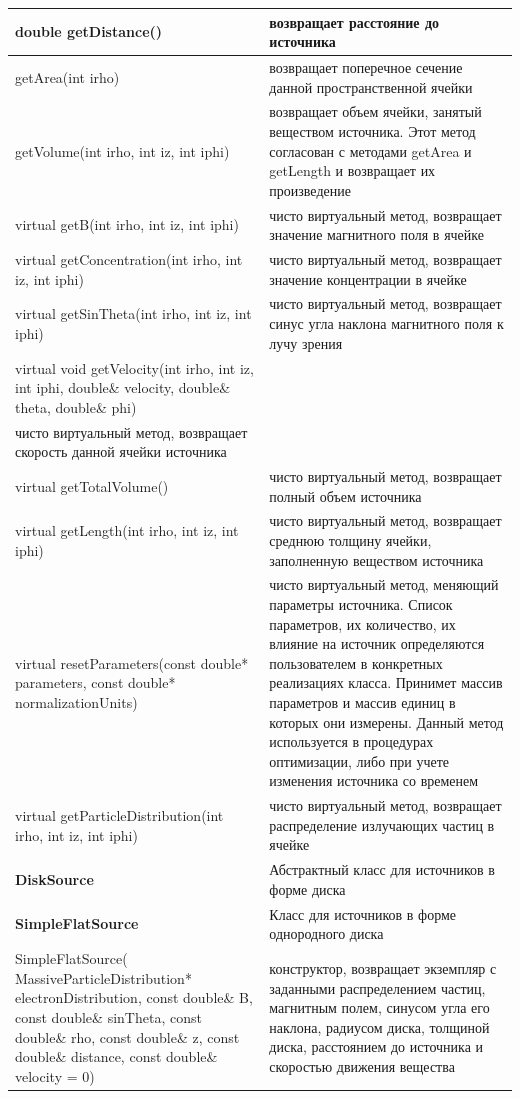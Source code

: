 \begin{small}
\begin{xtabular}{|p{0.5\textwidth}|p{0.5\textwidth}|}
		\hline
		double getDistance() & возвращает расстояние до источника\\
		\hline
		getArea(int irho) & возвращает поперечное сечение данной пространственной ячейки\\
		\hline
		getVolume(int irho, int iz, int iphi) & возвращает объем ячейки, занятый веществом источника. Этот метод согласован с методами getArea и getLength и возвращает их произведение\\
		\hline
		virtual getB(int irho, int iz, int iphi) & чисто виртуальный метод, возвращает значение магнитного поля в ячейке\\
		\hline
		virtual getConcentration(int irho, int iz, int iphi) & чисто виртуальный метод, возвращает значение концентрации в ячейке \\
		\hline
		virtual getSinTheta(int irho, int iz, int iphi) & чисто виртуальный метод, возвращает синус угла наклона магнитного поля к лучу зрения\\
		\hline
		virtual void getVelocity(int irho, int iz, int iphi, double\& velocity, double\& theta, double\& phi) &\\
		чисто виртуальный метод, возвращает скорость данной ячейки источника\\
		\hline
		virtual getTotalVolume() & чисто виртуальный метод, возвращает полный объем источника\\
		\hline
		virtual getLength(int irho, int iz, int iphi) & чисто виртуальный метод, возвращает среднюю толщину ячейки, заполненную веществом источника\\
		\hline
		virtual resetParameters(const double* parameters, const double* normalizationUnits) & чисто виртуальный метод, меняющий параметры источника. Список параметров, их количество, их влияние на источник определяются пользователем в конкретных реализациях класса. Принимет массив параметров и массив единиц в которых они измерены. Данный метод используется в процедурах оптимизации, либо при учете изменения источника со временем\\
		\hline
		virtual getParticleDistribution(int irho, int iz, int iphi) & чисто виртуальный метод, возвращает распределение излучающих частиц в ячейке\\
		\hline
		\textbf{DiskSource} & Абстрактный класс для источников в форме диска\\
		\hline
		\textbf{SimpleFlatSource} & Класс для источников в форме однородного диска\\
		\hline
		SimpleFlatSource( MassiveParticleDistribution* electronDistribution, const double\& B, const double\& sinTheta, const double\& rho, const double\& z, const double\& distance, const double\& velocity = 0) & конструктор, возвращает экземпляр с заданными распределением частиц, магнитным полем, синусом угла его наклона, радиусом диска, толщиной диска, расстоянием до источника и скоростью движения вещества\\

\end{xtabular}
\end{small}
